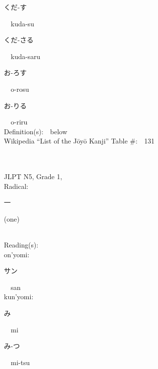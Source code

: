 \begin{multicols}{2}
{\hspace*{2em}}{\begin{CJK}{UTF8}{min} くだ-す \end{CJK}}\ \ kuda-su\ \ \\
{\hspace*{2em}}{\begin{CJK}{UTF8}{min} くだ-さる \end{CJK}}\ \ kuda-saru\ \ \\
{\hspace*{2em}}{\begin{CJK}{UTF8}{min} お-ろす \end{CJK}}\ \ o-rosu\ \ \\
{\hspace*{2em}}{\begin{CJK}{UTF8}{min} お-りる \end{CJK}}\ \ o-riru\ \ \\
Definition(s):\ \ below \\
Wikipedia ``List of the J\=oy\=o Kanji'' Table \#:\ \ 131 \\
\ \ \\
{\fontsize{34pt}{40pt}  }\ \ \\  %
{JLPT N5, Grade 1, \\Radical:\ \ {\begin{CJK}{UTF8}{min} 一 \end{CJK}} (one) } \\
Reading(s):\ \ \\
{\hspace*{1em}}on'yomi:\ \ \\
{\hspace*{2em}}{\begin{CJK}{UTF8}{min} サン \end{CJK}}\ \ san\ \ \\
{\hspace*{1em}}kun'yomi:\ \ \\
{\hspace*{2em}}{\begin{CJK}{UTF8}{min} み \end{CJK}}\ \ mi\ \ \\
{\hspace*{2em}}{\begin{CJK}{UTF8}{min} み-つ \end{CJK}}\ \ mi-tsu\ \ \\

\end{multicols}
